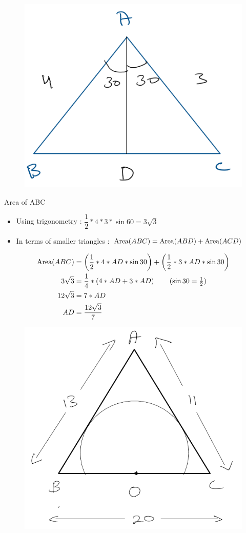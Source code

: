 
\begin{figure}[h!]
    \centering
    \includegraphics[width=0.40\linewidth]{Quant//Geometry//Images//Triangles/area_of_triangle_question_2.png}
\end{figure}

Area of ABC 
\begin{itemize}
    \item Using trigonometry : $\dfrac{1}{2} * 4 * 3 * \sin{60} = 3 \sqrt{3}$
    \item In terms of smaller triangles : $\text{Area}({ABC}) = \text{Area}({ABD}) + \text{Area}({ACD})$
\end{itemize}

\begin{align*}
    \Area{ABC} &= \bigParen{\dfrac{1}{2} * 4 * AD * \sin{30}} +  \bigParen{\dfrac{1}{2} * 3 * AD * \sin{30}} \\
    3 \sqrt{3} &= \dfrac{1}{4} * \bigParen{4 * AD + 3 * AD} \tag{$\sin{30} = \frac{1}{2} $} \\
    12 \sqrt{3} &= 7 * AD \\
    AD &= \dfrac{12 \sqrt{3}}{7}
\end{align*}


\begin{figure}[h!]
    \centering
    \includegraphics[width=0.4\linewidth]{Quant//Geometry//Images//Triangles/area_of_triangle_question_3.png}
\end{figure}

